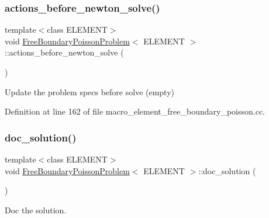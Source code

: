 \subsubsection{\texorpdfstring{actions\+\_\+before\+\_\+newton\+\_\+solve()}{actions\_before\_newton\_solve()}\hspace{0.1cm}{\footnotesize\ttfamily [2/2]}}
{\footnotesize\ttfamily template$<$class E\+L\+E\+M\+E\+NT$>$ \\
void \hyperlink{classFreeBoundaryPoissonProblem}{Free\+Boundary\+Poisson\+Problem}$<$ E\+L\+E\+M\+E\+NT $>$\+::actions\+\_\+before\+\_\+newton\+\_\+solve (\begin{DoxyParamCaption}{ }\end{DoxyParamCaption})\hspace{0.3cm}{\ttfamily [inline]}}



Update the problem specs before solve (empty) 



Definition at line 162 of file macro\+\_\+element\+\_\+free\+\_\+boundary\+\_\+poisson.\+cc.

\mbox{\label{classFreeBoundaryPoissonProblem_a2282d8ac1d5753771a9a3cfc0417f6b6}} 
\subsubsection{\texorpdfstring{doc\+\_\+solution()}{doc\_solution()}\hspace{0.1cm}{\footnotesize\ttfamily [1/2]}}
{\footnotesize\ttfamily template$<$class E\+L\+E\+M\+E\+NT$>$ \\
void \hyperlink{classFreeBoundaryPoissonProblem}{Free\+Boundary\+Poisson\+Problem}$<$ E\+L\+E\+M\+E\+NT $>$\+::doc\+\_\+solution (\begin{DoxyParamCaption}{ }\end{DoxyParamCaption})}



Doc the solution. 

\mbox{\label{classFreeBoundaryPoissonProblem_a2282d8ac1d5753771a9a3cfc0417f6b6}} 
